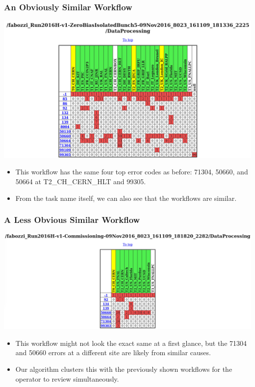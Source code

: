 \documentclass{beamer}
\begin{document}
\begin{frame}
  \frametitle{An Obviously Similar Workflow}

  \includegraphics[width=\linewidth]{similar.png}

  \begin{itemize}
  \item This workflow has the same four top error codes as before:
    71304, 50660, and 50664 at T2\_CH\_CERN\_HLT and 99305.
  \item From the task name itself, we can also see that the workflows are similar.
  \end{itemize}

\end{frame}

\begin{frame}
  \frametitle{A Less Obvious Similar Workflow}

  \includegraphics[width=\linewidth]{fnal_same_err.png}

  \begin{itemize}
  \item This workflow might not look the exact same at a first glance,
    but the 71304 and 50660 errors at a different site are likely from similar causes.
  \item Our algorithm clusters this with the previously shown workflows
    for the operator to review simultaneously.
  \end{itemize}

\end{frame}
\end{document}
